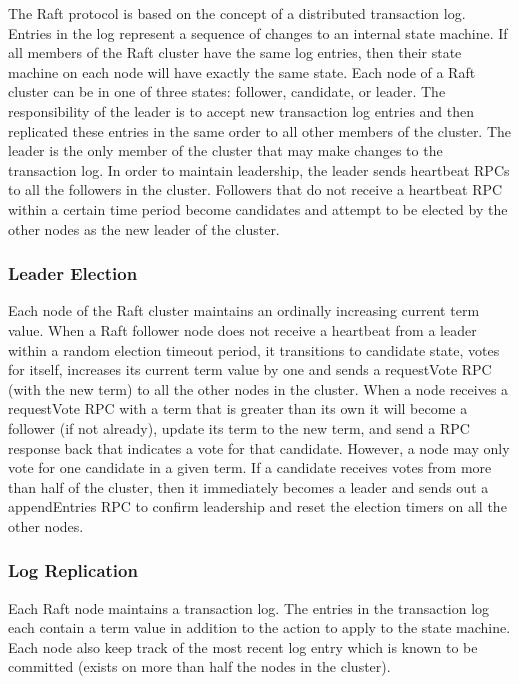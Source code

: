 \documentclass[9pt]{extarticle}
\begin{document}
\begin{multicols}{2}
The Raft protocol is based on the concept of a distributed transaction
log. Entries in the log represent a sequence of changes to an internal
state machine. If all members of the Raft cluster have the same log
entries, then their state machine on each node will have exactly the
same state. Each node of a Raft cluster can be in one of three states:
follower, candidate, or leader. The responsibility of the leader is to
accept new transaction log entries and then replicated these entries
in the same order to all other members of the cluster. The leader is
the only member of the cluster that may make changes to the
transaction log. In order to maintain leadership, the leader sends
heartbeat RPCs to all the followers in the cluster. Followers that
do not receive a heartbeat RPC within a certain time period become
candidates and attempt to be elected by the other nodes as the new
leader of the cluster.

\subsubsection{Leader Election}

Each node of the Raft cluster maintains an ordinally increasing
current term value. When a Raft follower node does not receive
a heartbeat from a leader within a random election timeout period, it
transitions to candidate state, votes for itself, increases its
current term value by one and sends a requestVote RPC (with the
new term) to all the other nodes in the cluster. When a node receives
a requestVote RPC with a term that is greater than its own it will
become a follower (if not already), update its term to the new term,
and send a RPC response back that indicates a vote for that candidate.
However, a node may only vote for one candidate in a given term. If
a candidate receives votes from more than half of the cluster, then it
immediately becomes a leader and sends out a appendEntries RPC to
confirm leadership and reset the election timers on all the other
nodes.

\subsubsection{Log Replication}

Each Raft node maintains a transaction log. The entries in the
transaction log each contain a term value in addition to the action to
apply to the state machine. Each node also keep track of the most
recent log entry which is known to be committed (exists on more than
half the nodes in the cluster).


\end{multicols}
\end{document}

